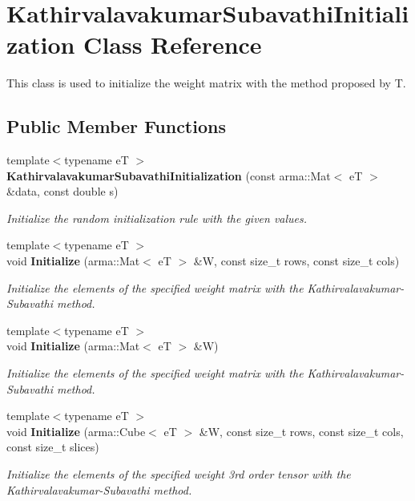 \section{Kathirvalavakumar\+Subavathi\+Initialization Class Reference}
\label{classmlpack_1_1ann_1_1KathirvalavakumarSubavathiInitialization}


This class is used to initialize the weight matrix with the method proposed by T.  


\subsection*{Public Member Functions}
\begin{DoxyCompactItemize}
\item 
{\footnotesize template$<$typename eT $>$ }\\\textbf{ Kathirvalavakumar\+Subavathi\+Initialization} (const arma\+::\+Mat$<$ eT $>$ \&data, const double s)
\begin{DoxyCompactList}\small\item\em Initialize the random initialization rule with the given values. \end{DoxyCompactList}\item 
{\footnotesize template$<$typename eT $>$ }\\void \textbf{ Initialize} (arma\+::\+Mat$<$ eT $>$ \&W, const size\+\_\+t rows, const size\+\_\+t cols)
\begin{DoxyCompactList}\small\item\em Initialize the elements of the specified weight matrix with the Kathirvalavakumar-\/\+Subavathi method. \end{DoxyCompactList}\item 
{\footnotesize template$<$typename eT $>$ }\\void \textbf{ Initialize} (arma\+::\+Mat$<$ eT $>$ \&W)
\begin{DoxyCompactList}\small\item\em Initialize the elements of the specified weight matrix with the Kathirvalavakumar-\/\+Subavathi method. \end{DoxyCompactList}\item 
{\footnotesize template$<$typename eT $>$ }\\void \textbf{ Initialize} (arma\+::\+Cube$<$ eT $>$ \&W, const size\+\_\+t rows, const size\+\_\+t cols, const size\+\_\+t slices)
\begin{DoxyCompactList}\small\item\em Initialize the elements of the specified weight 3rd order tensor with the Kathirvalavakumar-\/\+Subavathi method. \end{DoxyCompactList}\item 

\end{DoxyCompactItemize}
